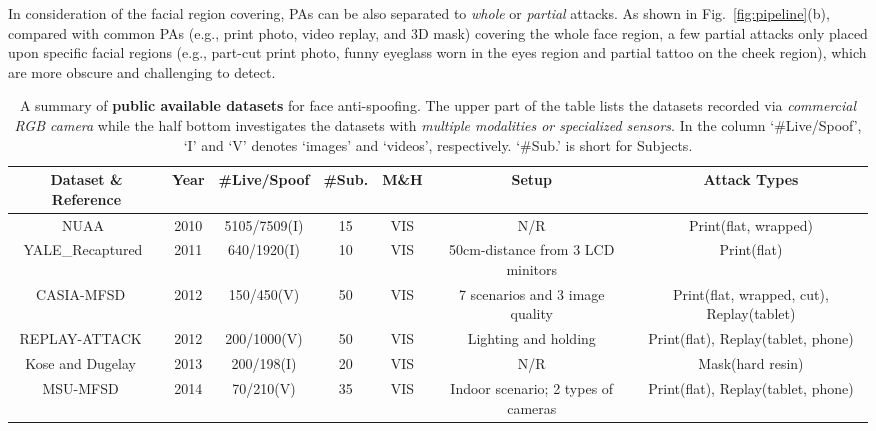 \documentclass[10pt,journal,compsoc]{IEEEtran}
\begin{document}
In consideration of the facial region covering, PAs can be also separated to \textit{whole} or \textit{partial} attacks. As shown in Fig.~\ref{fig:pipeline}(b), compared with common PAs (e.g., print photo, video replay, and 3D mask) covering the whole face region, a few partial attacks only placed upon specific facial regions (e.g., part-cut print photo, funny eyeglass worn in the eyes region and partial tattoo on the cheek region), which are more obscure and challenging to detect.




\begin{table}
\centering
\caption{A summary of \textbf{public available datasets} for face anti-spoofing. The upper part of the table lists the datasets recorded via \textit{commercial RGB camera} while the half bottom investigates the datasets with \textit{multiple modalities or specialized sensors}. In the column `\#Live/Spoof', `I' and `V' denotes `images' and `videos', respectively. `\#Sub.' is short for Subjects.} \label{tab:dataset}
\resizebox{0.96\textwidth}{!} {\begin{tabular}{c c c c c c c} 
 \toprule[1pt]
 Dataset \& Reference & Year & \#Live/Spoof & \#Sub. & M\&H & Setup & Attack Types \\
 \midrule
 NUAA~\cite{tan2010face} & 2010 & 5105/7509(I) & 15  & VIS & N/R & Print(flat, wrapped)\\

 \midrule
 YALE\_Recaptured~\cite{peixoto2011face} & 2011 & 640/1920(I) & 10  & VIS & 50cm-distance from 3 LCD minitors & Print(flat)\\

 \midrule
 CASIA-MFSD
~\cite{Zhang2012A} & 2012 & 150/450(V) & 50 & VIS & 7 scenarios and 3 image quality & Print(flat, wrapped, cut), Replay(tablet)\\

 \midrule
REPLAY-ATTACK
~\cite{ReplayAttack} & 2012 & 200/1000(V) & 50 & VIS &  Lighting and holding  & Print(flat), Replay(tablet, phone)\\


 \midrule
Kose and Dugelay
~\cite{kose2013shape} & 2013 & 200/198(I) & 20 & VIS &  N/R  & Mask(hard resin)\\



 \midrule
MSU-MFSD
~\cite{wen2015face} & 2014 & 70/210(V) & 35 & VIS &  Indoor scenario; 2 types of cameras & Print(flat), Replay(tablet, phone)\\




\end{tabular}}
\end{table}
\end{document}
